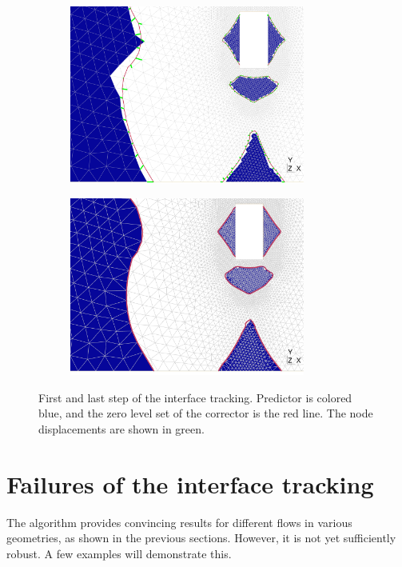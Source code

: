 \documentclass[11 pt]{report}
\begin{document}
\begin{figure}
    \centering
    \begin{subfigure}[t]{\textwidth}
        \centering
        \includegraphics[width=0.85\textwidth]{../figures/cylinder_mesh.pdf}
    \end{subfigure}\vspace{6pt}
    \begin{subfigure}[t]{\textwidth}
        \centering
        \includegraphics[width=0.85\textwidth]{../figures/cylinder_mesh_2.pdf}
    \end{subfigure}
    \caption{First and last step of the interface tracking. Predictor is colored blue, and the zero level set of the corrector is the red line. The node displacements are shown in green.}
    \label{fig:cylinderTracking}
\end{figure}

\section{Failures of the interface tracking}
\label{sec:failures}
The algorithm provides convincing results for different flows in various geometries, as shown in the previous sections. However, it is not yet sufficiently robust. A few examples will demonstrate this.
\end{document}
